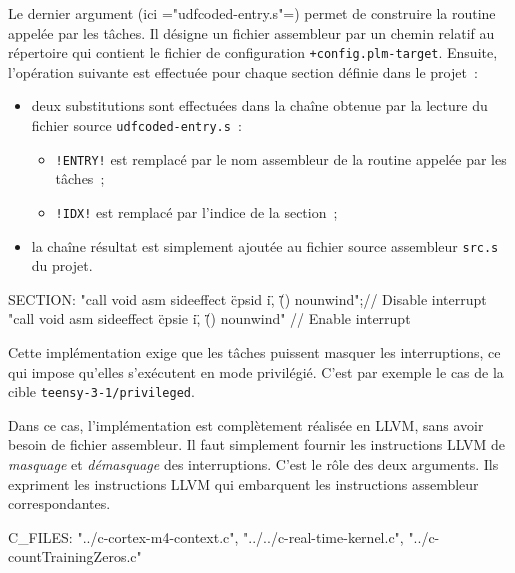 Le dernier argument (ici \plm="udfcoded-entry.s"=) permet de construire la routine appelée par les tâches. Il désigne un fichier assembleur par un chemin relatif au répertoire qui contient le fichier de configuration \texttt{+config.plm-target}. Ensuite, l'opération suivante est effectuée pour chaque section définie dans le projet~:
\begin{itemize}
  \item deux substitutions sont effectuées dans la chaîne obtenue par la lecture du fichier source \texttt{udfcoded-entry.s}~:
  \begin{itemize}
    \item \texttt{!ENTRY!} est remplacé par le nom assembleur de la routine appelée par les tâches~;
    \item \texttt{!IDX!} est remplacé par l'indice de la section~;
  \end{itemize}
  \item la chaîne résultat est simplement ajoutée au fichier source assembleur \texttt{src.s} du projet.
\end{itemize}




\begin{PLM}
SECTION:
"call void asm sideeffect \"cpsid i\", \"\"() nounwind";// Disable interrupt
"call void asm sideeffect \"cpsie i\", \"\"() nounwind" // Enable interrupt
\end{PLM}

Cette implémentation exige que les tâches puissent masquer les interruptions, ce qui impose qu'elles s'exécutent en mode privilégié. C'est par exemple le cas de la cible \texttt{teensy-3-1/privileged}.

Dans ce cas, l'implémentation est complètement réalisée en LLVM, sans avoir besoin de fichier assembleur. Il faut simplement fournir les instructions LLVM de \emph{masquage} et \emph{démasquage} des interruptions. C'est le rôle des deux arguments. Ils expriment les instructions LLVM qui embarquent les instructions assembleur correspondantes.





\begin{PLM}
C_FILES:
  "../c-cortex-m4-context.c",
  "../../c-real-time-kernel.c",
  "../c-countTrainingZeros.c"
\end{PLM}

